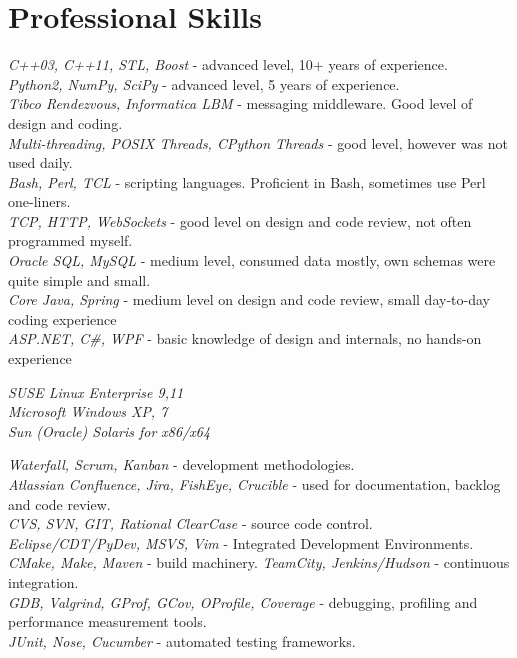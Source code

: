 \documentclass[10pt]{article} %
\begin{document}

\section{Professional Skills}

{
\textit{C++03, C++11, STL, Boost} - advanced level, 10+ years of experience.\\
\textit{Python2, NumPy, SciPy} - advanced level, 5 years of experience.\\
\textit{Tibco Rendezvous, Informatica LBM} - messaging middleware. Good level of design and coding.\\
\textit{Multi-threading, POSIX Threads, CPython Threads} - good level, however was not used daily.\\
\textit{Bash, Perl, TCL} - scripting languages. Proficient in Bash, sometimes use Perl one-liners.\\
\textit{TCP, HTTP, WebSockets} - good level on design and code review, not often programmed myself.\\
\textit{Oracle SQL, MySQL} - medium level, consumed data mostly, own schemas were quite simple and small.\\
\textit{Core Java, Spring} - medium level on design and code review, small day-to-day coding experience\\
\textit{ASP.NET, C\#, WPF} - basic knowledge of design and internals, no hands-on experience\\
}


{
\textit{SUSE Linux Enterprise 9,11}\\
\textit{Microsoft Windows XP, 7}\\
\textit{Sun (Oracle) Solaris for x86/x64}
}


{
\textit{Waterfall, Scrum, Kanban} - development methodologies.\\
\textit{Atlassian Confluence, Jira, FishEye, Crucible} - used for documentation, backlog and code review.\\
\textit{CVS, SVN, GIT, Rational ClearCase} - source code control.\\
\textit{Eclipse/CDT/PyDev, MSVS, Vim} - Integrated Development Environments.\\
\textit{CMake, Make, Maven} - build machinery.
\textit{TeamCity, Jenkins/Hudson} - continuous integration.\\
\textit{GDB, Valgrind, GProf, GCov, OProfile, Coverage} - debugging, profiling and performance measurement tools.\\ 
\textit{JUnit, Nose, Cucumber} - automated testing frameworks.\\
}
\end{document}
